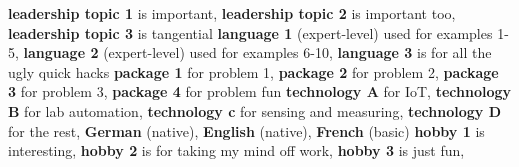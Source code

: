 


\begin{cvskills}

    {\textbf{leadership topic 1} is important, \textbf{leadership topic 2} is important too, \textbf{leadership topic 3} is tangential}
    {\textbf{language 1} (expert-level) used for examples 1-5, \textbf{language 2} (expert-level) used for examples 6-10, \textbf{language 3} is for all the ugly quick hacks}
    {\textbf{package 1} for problem 1, \textbf{package 2} for problem 2, \textbf{package 3} for problem 3, \textbf{package 4} for problem fun} %
    {\textbf{technology A} for IoT, \textbf{technology B} for lab automation, \textbf{technology c} for sensing and measuring, \textbf{technology D} for the rest, } %
    {\textbf{German} (native), \textbf{English} (native), \textbf{French} (basic)} %
    {\textbf{hobby 1} is interesting, \textbf{hobby 2} is for taking my mind off work, \textbf{hobby 3} is just fun, } %

\end{cvskills} 